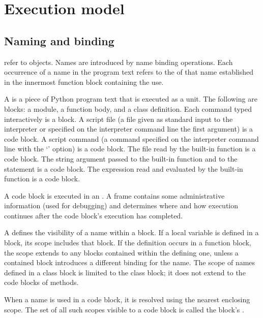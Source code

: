 \chapter{Execution model \label{execmodel}}


\section{Naming and binding \label{naming}}

 refer to objects.  Names are introduced by
name binding operations.  Each occurrence of a name in the program
text refers to the  of that name
established in the innermost function block containing the use.

A  is a piece of Python program text that is
executed as a unit.  The following are blocks: a module, a function
body, and a class definition.  Each command typed interactively is a
block.  A script file (a file given as standard input to the
interpreter or specified on the interpreter command line the first
argument) is a code block.  A script command (a command specified on
the interpreter command line with the `' option) is a code
block.  The file read by the built-in function 
is a code block.  The string argument passed to the built-in function
 and to the  statement is a code block.
The expression read and evaluated by the built-in function
 is a code block.

A code block is executed in an .  A frame contains some
administrative information (used for debugging) and determines where
and how execution continues after the code block's execution has
completed.

A  defines the visibility of a name within a
block.  If a local variable is defined in a block, its scope includes
that block.  If the definition occurs in a function block, the scope
extends to any blocks contained within the defining one, unless a
contained block introduces a different binding for the name.  The
scope of names defined in a class block is limited to the class block;
it does not extend to the code blocks of methods.

When a name is used in a code block, it is resolved using the nearest
enclosing scope.  The set of all such scopes visible to a code block
is called the block's .  

